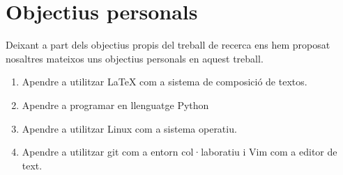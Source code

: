 \section{Objectius personals}
Deixant a part dels objectius propis del treball de recerca ens hem proposat nosaltres mateixos uns objectius personals en aquest treball.
\begin{enumerate}
 \item Apendre a utilitzar LaTeX com a sistema de composició de textos.

 \item Apendre a programar en llenguatge Python

 \item Apendre a utilitzar Linux com a sistema operatiu.

 \item Apendre a utilitzar git com a entorn col·laboratiu i Vim com a editor de text.

\end{enumerate}

